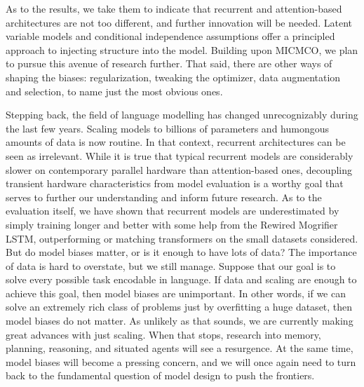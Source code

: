 \documentclass[12pt,a4paper,oneside]{book}
\makeatletter
\newcommand*\currentfontsize{\dimexpr\f@size pt\relax}
\makeatother
\begin{document}
As to the results, we take them to indicate that recurrent and attention-based architectures are not too different, and further innovation will be needed.
Latent variable models and conditional independence assumptions offer a principled approach to injecting structure into the model.
Building upon MICMCO, we plan to pursue this avenue of research further.
That said, there are other ways of shaping the biases: regularization, tweaking the optimizer, data augmentation and selection, to name just the most obvious ones.

Stepping back, the field of language modelling has changed unrecognizably during the last few years.
Scaling models to billions of parameters and humongous amounts of data is now routine.
In that context, recurrent architectures can be seen as irrelevant.
While it is true that typical recurrent models are considerably slower on contemporary parallel hardware than attention-based ones, decoupling transient hardware characteristics from model evaluation is a worthy goal that serves to further our understanding and inform future research.
As to the evaluation itself, we have shown that recurrent models are underestimated by simply training longer and better with some help from the Rewired Mogrifier LSTM, outperforming or matching transformers on the small datasets considered.
But do model biases matter, or is it enough to have lots of data?
The importance of data is hard to overstate, but we still manage.
Suppose that our goal is to solve every possible task encodable in language.
If data and scaling are enough to achieve this goal, then model biases are unimportant.
In other words, if we can solve an extremely rich class of problems just by overfitting a huge dataset, then model biases do not matter.
As unlikely as that sounds, we are currently making great advances with just scaling.
When that stops, research into memory, planning, reasoning, and situated agents will see a resurgence.
At the same time, model biases will become a pressing concern, and we will once again need to turn back to the fundamental question of model design to push the frontiers.


\clearpage

{
  \renewcommand{\bibfont}{
    \setstretch{1.0}\fontsize{0.9\currentfontsize}{0.797\groundskip}\selectfont
    \groundlevel}
  
  
}


\clearpage
\begin{appendices}
\end{appendices}

\end{document}
